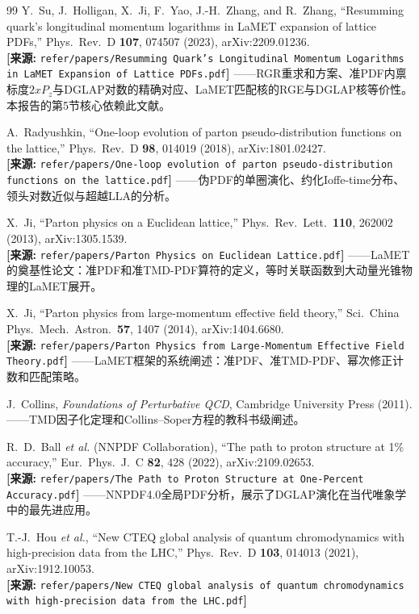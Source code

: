 \documentclass[12pt,a4paper]{ctexart}
\theoremstyle{definition}
\begin{document}
\begin{thebibliography}{99}
Y.~Su, J.~Holligan, X.~Ji, F.~Yao, J.-H.~Zhang, and R.~Zhang,
``Resumming quark's longitudinal momentum logarithms in LaMET expansion of lattice PDFs,''
Phys.\ Rev.\ D \textbf{107}, 074507 (2023), arXiv:2209.01236.
\\\textbf{[来源:} \texttt{refer/papers/Resumming Quark's Longitudinal Momentum Logarithms in LaMET Expansion of Lattice PDFs.pdf}\textbf{]}
——RGR重求和方案、准PDF内禀标度$2xP_z$与DGLAP对数的精确对应、LaMET匹配核的RGE与DGLAP核等价性。
本报告的第5节核心依赖此文献。

A.~Radyushkin,
``One-loop evolution of parton pseudo-distribution functions on the lattice,''
Phys.\ Rev.\ D \textbf{98}, 014019 (2018), arXiv:1801.02427.
\\\textbf{[来源:} \texttt{refer/papers/One-loop evolution of parton pseudo-distribution functions on the lattice.pdf}\textbf{]}
——伪PDF的单圈演化、约化Ioffe-time分布、领头对数近似与超越LLA的分析。

X.~Ji,
``Parton physics on a Euclidean lattice,''
Phys.\ Rev.\ Lett.\ \textbf{110}, 262002 (2013), arXiv:1305.1539.
\\\textbf{[来源:} \texttt{refer/papers/Parton Physics on Euclidean Lattice.pdf}\textbf{]}
——LaMET的奠基性论文：准PDF和准TMD-PDF算符的定义，等时关联函数到大动量光锥物理的LaMET展开。

X.~Ji,
``Parton physics from large-momentum effective field theory,''
Sci.\ China Phys.\ Mech.\ Astron.\ \textbf{57}, 1407 (2014), arXiv:1404.6680.
\\\textbf{[来源:} \texttt{refer/papers/Parton Physics from Large-Momentum Effective Field Theory.pdf}\textbf{]}
——LaMET框架的系统阐述：准PDF、准TMD-PDF、幂次修正计数和匹配策略。

J.~Collins,
\textit{Foundations of Perturbative QCD},
Cambridge University Press (2011).
——TMD因子化定理和Collins--Soper方程的教科书级阐述。

R.~D.~Ball \textit{et al.} (NNPDF Collaboration),
``The path to proton structure at 1\% accuracy,''
Eur.\ Phys.\ J.\ C \textbf{82}, 428 (2022), arXiv:2109.02653.
\\\textbf{[来源:} \texttt{refer/papers/The Path to Proton Structure at One-Percent Accuracy.pdf}\textbf{]}
——NNPDF4.0全局PDF分析，展示了DGLAP演化在当代唯象学中的最先进应用。

T.-J.~Hou \textit{et al.},
``New CTEQ global analysis of quantum chromodynamics with high-precision data from the LHC,''
Phys.\ Rev.\ D \textbf{103}, 014013 (2021), arXiv:1912.10053.
\\\textbf{[来源:} \texttt{refer/papers/New CTEQ global analysis of quantum chromodynamics with high-precision data from the LHC.pdf}\textbf{]}


\end{thebibliography}
\end{document}

